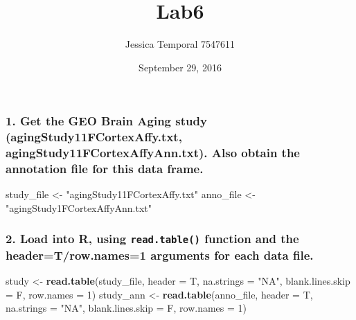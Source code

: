 \documentclass[]{article}
\title{Lab6}
\author{Jessica Temporal 7547611}
\date{September 29, 2016}
\newenvironment{Shaded}{\begin{snugshade}}{\end{snugshade}}
\newcommand{\KeywordTok}[1]{\textcolor[rgb]{0.13,0.29,0.53}{\textbf{{#1}}}}
\newcommand{\DataTypeTok}[1]{\textcolor[rgb]{0.13,0.29,0.53}{{#1}}}
\newcommand{\DecValTok}[1]{\textcolor[rgb]{0.00,0.00,0.81}{{#1}}}
\newcommand{\StringTok}[1]{\textcolor[rgb]{0.31,0.60,0.02}{{#1}}}
\newcommand{\NormalTok}[1]{{#1}}
\begin{document}
\maketitle

{
\setcounter{tocdepth}{4}
\tableofcontents
}
\newpage

\subsubsection{1. Get the GEO Brain Aging study
(agingStudy11FCortexAffy.txt, agingStudy11FCortexAffyAnn.txt). Also
obtain the annotation file for this data
frame.}\label{get-the-geo-brain-aging-study-agingstudy11fcortexaffy.txt-agingstudy11fcortexaffyann.txt.-also-obtain-the-annotation-file-for-this-data-frame.}

\begin{Shaded}
\begin{Highlighting}[]
\NormalTok{study_file <-}\StringTok{ "agingStudy11FCortexAffy.txt"}
\NormalTok{anno_file <-}\StringTok{ "agingStudy1FCortexAffyAnn.txt"}
\end{Highlighting}
\end{Shaded}

\subsubsection{\texorpdfstring{2. Load into R, using
\texttt{read.table()} function and the header=T/row.names=1 arguments
for each data
file.}{2. Load into R, using read.table() function and the header=T/row.names=1 arguments for each data file.}}\label{load-into-r-using-read.table-function-and-the-headertrow.names1-arguments-for-each-data-file.}

\begin{Shaded}
\begin{Highlighting}[]
\NormalTok{study <-}\StringTok{ }\KeywordTok{read.table}\NormalTok{(study_file, }\DataTypeTok{header =} \NormalTok{T, }\DataTypeTok{na.strings =} \StringTok{"NA"}\NormalTok{, }\DataTypeTok{blank.lines.skip =} \NormalTok{F, }\DataTypeTok{row.names =} \DecValTok{1}\NormalTok{)}
\NormalTok{study_ann <-}\StringTok{ }\KeywordTok{read.table}\NormalTok{(anno_file, }\DataTypeTok{header =} \NormalTok{T, }\DataTypeTok{na.strings =} \StringTok{"NA"}\NormalTok{, }\DataTypeTok{blank.lines.skip =} \NormalTok{F, }\DataTypeTok{row.names =} \DecValTok{1}\NormalTok{)}
\end{Highlighting}
\end{Shaded}
\end{document}

